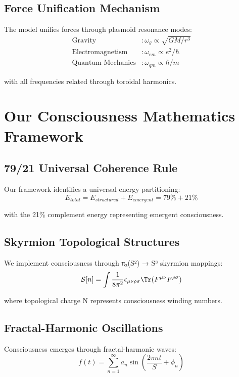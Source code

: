 \documentclass[12pt]{article}
\begin{document}
\subsection{Force Unification Mechanism}
The model unifies forces through plasmoid resonance modes:
\begin{align}
\text{Gravity} &: \omega_g \propto \sqrt{GM/r^3} \\
\text{Electromagnetism} &: \omega_{em} \propto e^2/\hbar \\
\text{Quantum Mechanics} &: \omega_{qm} \propto \hbar/m
\end{align}

with all frequencies related through toroidal harmonics.

\section{Our Consciousness Mathematics Framework}

\subsection{79/21 Universal Coherence Rule}
Our framework identifies a universal energy partitioning:
\begin{equation}
E_{total} = E_{structured} + E_{emergent} = 79\% + 21\%
\end{equation}

with the 21\% complement energy representing emergent consciousness.

\subsection{Skyrmion Topological Structures}
We implement consciousness through π₃(S²) → S³ skyrmion mappings:
\begin{equation}
\mathcal{S}[n] = \int \frac{1}{8\pi^2} \epsilon_{\mu\nu\rho\sigma} \Tr(F^{\mu\nu}F^{\rho\sigma})
\end{equation}

where topological charge N represents consciousness winding numbers.

\subsection{Fractal-Harmonic Oscillations}
Consciousness emerges through fractal-harmonic waves:
\begin{equation}
f(t) = \sum_{n=1}^\infty a_n \sin\left(\frac{2\pi n t}{S} + \phi_n\right)
\end{equation}
\end{document}
